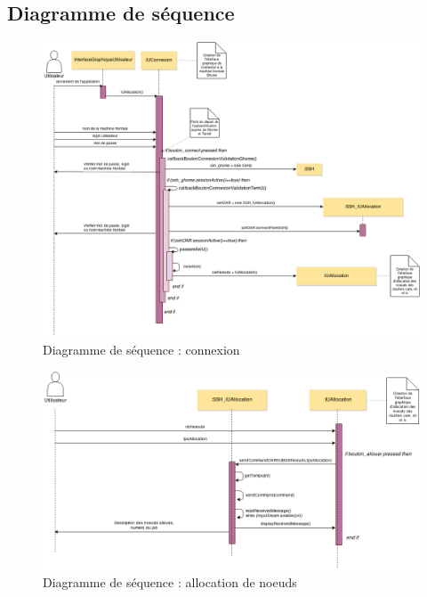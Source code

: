 \subsection{Diagramme de séquence}
\label{sec:diagr-de-sequ}

\begin{figure}[h!]
  \centerline{
  \includegraphics[width=18cm]{images/diagramme_sequence.png}}
  \caption{Diagramme de séquence : connexion}
  \label{fig:diag_seq}
\end{figure}


\begin{figure}[h!]
  \centerline{
  \includegraphics[width=18cm]{images/allocation_noeuds.png}}
  \caption{Diagramme de séquence : allocation de noeuds}
  \label{fig:diag_seq2}
\end{figure}

